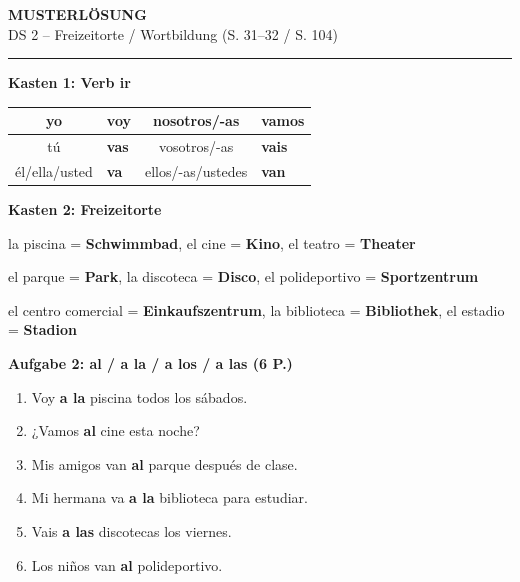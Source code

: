 \documentclass[11pt,a4paper]{article}
\newcommand{\lsg}[1]{\textcolor{loesung}{\textbf{#1}}}
\begin{document}
\begin{center}
{\Large\textbf{\textcolor{loesung}{MUSTERLÖSUNG}}}\\[0.3em]
{\large DS 2 -- Freizeitorte / Wortbildung (S. 31--32 / S. 104)}
\end{center}

\vspace{0.5em}
\hrule
\vspace{1em}

\begin{gruppenbox}

\textbf{Kasten 1: Verb ir}

\begin{tabularx}{\textwidth}{@{}|c|l||c|l|@{}}
\hline
yo & \lsg{voy} & nosotros/-as & \lsg{vamos} \\
\hline
tú & \lsg{vas} & vosotros/-as & \lsg{vais} \\
\hline
él/ella/usted & \lsg{va} & ellos/-as/ustedes & \lsg{van} \\
\hline
\end{tabularx}

\vspace{0.5em}

\textbf{Kasten 2: Freizeitorte}

la piscina = \lsg{Schwimmbad}, el cine = \lsg{Kino}, el teatro = \lsg{Theater}

el parque = \lsg{Park}, la discoteca = \lsg{Disco}, el polideportivo = \lsg{Sportzentrum}

el centro comercial = \lsg{Einkaufszentrum}, la biblioteca = \lsg{Bibliothek}, el estadio = \lsg{Stadion}

\vspace{0.5em}

\textbf{Aufgabe 2: al / a la / a los / a las (6 P.)}
\begin{enumerate}[label=\alph*), leftmargin=2em, nosep]
    \item Voy \lsg{a la} piscina todos los sábados.
    \item ¿Vamos \lsg{al} cine esta noche?
    \item Mis amigos van \lsg{al} parque después de clase.
    \item Mi hermana va \lsg{a la} biblioteca para estudiar.
    \item Vais \lsg{a las} discotecas los viernes.
    \item Los niños van \lsg{al} polideportivo.
\end{enumerate}


\end{gruppenbox}
\end{document}
